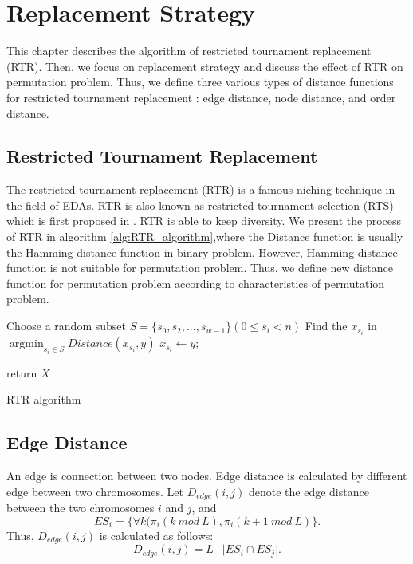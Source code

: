 \section{Replacement Strategy}
\label{ch:replacement_strategy}

This chapter describes the algorithm of restricted tournament replacement (RTR). Then, we focus on replacement strategy and discuss the effect of RTR on permutation problem. Thus, we define three various types of distance functions for restricted tournament replacement : edge distance, node distance, and order distance.


\subsection{Restricted Tournament Replacement}
The restricted tournament replacement (RTR) is a famous niching technique in the field of EDAs. RTR is also known as restricted tournament selection (RTS) which is first proposed in \citep{harik1995rts}. RTR is able to keep diversity. We present the process of RTR in algorithm \ref{alg:RTR_algorithm},where the Distance function is usually the Hamming distance function in binary problem. However, Hamming distance function is not suitable for permutation problem. Thus, we define new distance function for permutation problem according to characteristics of permutation problem.


\begin{algorithm}[htbp]
    {
        Choose a random subset $S =\lbrace s_0, s_2, ..., s_{w-1}\rbrace (0\leq s_i <n)$\;
        Find the $x_{s_i}$ in $\mathop{\arg\min}_{{s_i} \in S} Distance(x_{s_i},y)$\;
              {
        $x_{s_i} \leftarrow y$;
        }
        
    }
    return $X$\;
    \caption{RTR algorithm}
    \label{alg:RTR_algorithm}
\end{algorithm}

\subsection{Edge Distance}


An edge is connection between two nodes. Edge distance is calculated by different edge between two chromosomes. Let $D_{edge} (i,j)$ denote the edge distance between the two chromosomes $i$ and $j$, and \[ES_i=\lbrace\forall k(\pi_i(k\ mod\ L), \pi_i(k+1\ mod\ L)\rbrace.\] Thus, $D_{edge} (i,j)$ is calculated as follows:\[D_{edge} (i,j)=L-\vert ES_i\cap ES_j\vert.\]

